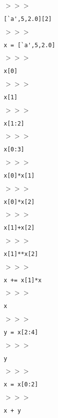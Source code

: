 \documentclass[11pt]{article}
\begin{document}
\begin{itemize}
\item[$>>>$] \begin{verbatim}[`a',5,2.0][2]\end{verbatim}
\item[$>>>$] \begin{verbatim}x = [`a',5,2.0]\end{verbatim}
\item[$>>>$] \begin{verbatim}x[0]\end{verbatim}
\item[$>>>$] \begin{verbatim}x[1]\end{verbatim}
\item[$>>>$] \begin{verbatim}x[1:2]\end{verbatim}
\item[$>>>$] \begin{verbatim}x[0:3]\end{verbatim}
\item[$>>>$] \begin{verbatim}x[0]*x[1]\end{verbatim}
\item[$>>>$] \begin{verbatim}x[0]*x[2]\end{verbatim}
\item[$>>>$] \begin{verbatim}x[1]+x[2]\end{verbatim}
\item[$>>>$] \begin{verbatim}x[1]**x[2]\end{verbatim}
\item[$>>>$] \begin{verbatim}x += x[1]*x\end{verbatim}
\item[$>>>$] \begin{verbatim}x\end{verbatim}
\item[$>>>$] \begin{verbatim}y = x[2:4]\end{verbatim}
\item[$>>>$] \begin{verbatim}y\end{verbatim}
\item[$>>>$] \begin{verbatim}x = x[0:2]\end{verbatim}
\item[$>>>$] \begin{verbatim}x + y\end{verbatim}

\end{itemize}
\end{document}
